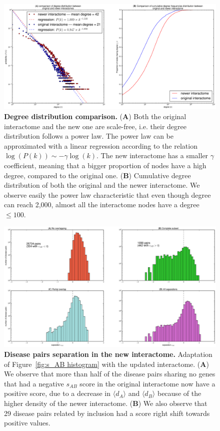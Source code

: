 \documentclass[letterpaper]{article}
\begin{document}
	\begin{figure}[!t]
		\hspace{-1.8cm}
		\vspace{-.5cm}
		\includegraphics[scale=.36]{images/degree_distributions_comparison.eps}
		\caption{{\bf Degree distribution comparison.} ({\bf A})  Both the original interactome and the new one
		are scale-free, i.e. their degree distribution follows a power law. The power law can be approximated
		with a linear regression according to the relation $\log(P(k)) \sim -\gamma\log(k)$. The new interactome
		has a smaller $\gamma$ coefficient, meaning that a bigger proportion of nodes have a high degree,
		compared to the original one.
		({\bf B}) Cumulative degree distribution of both the original and the newer interactome. We observe
		easily the power law characteristic that even though degree can reach 2,000, almost all the interactome
		nodes have a degree $\leq 100$.
		\label{fig:degree distribution comparison}}
	\end{figure}

	\begin{figure}[t!]
		\hspace{-1.8cm}
		\vspace{-1cm}
		\includegraphics[scale=.35]{images/new_interactome_s_AB_histogram.eps}
		\caption{{\bf Disease pairs separation in the new interactome.} Adaptation of Figure~\ref{fig:s_AB histogram} with the
		updated interactome.
		({\bf A}) We observe that more than half of the disease pairs sharing no genes that had a negative $s_{AB}$ score
		in the original interactome now have a positive score, due to a decrease in $\langle d_A \rangle$ and $\langle d_B \rangle$
		because of the higher density of the newer interactome. ({\bf B}) We also observe that 29 disease pairs related by inclusion
		had a score right shift towards positive values.
		\label{fig:new interactome s_AB}}
	\end{figure}
\end{document}
